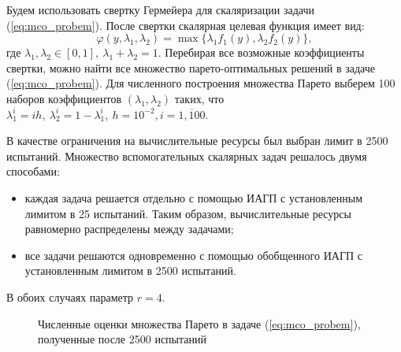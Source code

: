 Будем использовать свертку Гермейера для скаляризации задачи (\ref{eq:mco_probem}).
После свертки скалярная целевая функция имеет вид:
\begin{equation}
  \varphi(y,\lambda_1,\lambda_2)=\max\{\lambda_1 f_1(y), \lambda_2 f_2(y)\},
\end{equation}
где \(\lambda_1,\lambda_2\in[0,1],\: \lambda_1+\lambda_2=1\). Перебирая все возможные
коэффициенты свертки, можно найти все множество парето-оптимальных решений в
задаче (\ref{eq:mco_probem}). Для численного построения множества Парето выберем
100 наборов коэффициентов \((\lambda_1,\lambda_2)\) таких, что
\(\lambda_1^i=i h,\: \lambda_2^i=1-\lambda_1^i,\: h=10^{-2},i=\overline{1, 100}\).

В качестве ограничения на вычислительные ресурсы был выбран лимит в 2500 испытаний.
Множество вспомогательных скалярных задач решалось двумя способами:
\begin{itemize}
  \item каждая задача решается отдельно с помощью ИАГП с установленным лимитом в
  25 испытаний. Таким образом, вычислительные ресурсы равномерно распределены между задачами;
  \item все задачи решаются одновременно с помощью обобщенного ИАГП с установленным лимитом в
  2500 испытаний.
\end{itemize}
В обоих случаях параметр \(r=4\).

\begin{figure}[ht]
    \centering
    \caption{Численные оценки множества Парето в задаче (\ref{eq:mco_probem}), полученные после 2500 испытаний}
    \label{fig:mco_pareto}
\end{figure}

